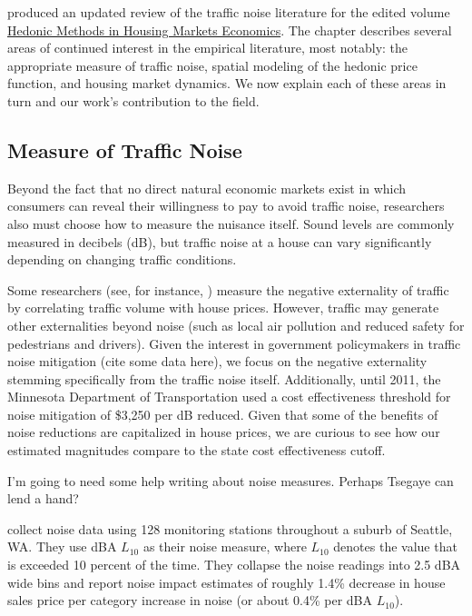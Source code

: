 \documentclass{article}\usepackage{graphicx, color}
\begin{document}
\citet{Nelson2008} produced an updated review of the traffic noise literature for the edited volume \underline{Hedonic Methods in Housing Markets Economics}. The chapter describes several areas of continued interest in the empirical literature, most notably: the appropriate measure of traffic noise, spatial modeling of the hedonic price function, and housing market dynamics. We now explain each of these areas in turn and our work's contribution to the field.

\subsection{Measure of Traffic Noise}

Beyond the fact that no direct natural economic markets exist in which consumers can reveal their willingness to pay to avoid traffic noise, researchers also must choose how to measure the nuisance itself. Sound levels are commonly measured in decibels (dB), but traffic noise at a house can vary significantly depending on changing traffic conditions.

Some researchers (see, for instance, \citet{HughesJr.1992}) measure the negative externality of traffic by correlating traffic volume with house prices. However, traffic may generate other externalities beyond noise (such as local air pollution and reduced safety for pedestrians and drivers). Given the interest in government policymakers in traffic noise mitigation (cite some data here), we focus on the negative externality stemming specifically from the traffic noise itself. Additionally, until 2011, the Minnesota Department of Transportation used a cost effectiveness threshold for noise mitigation of \$3,250 per dB reduced. Given that some of the benefits of noise reductions are capitalized in house prices, we are curious to see how our estimated magnitudes compare to the state cost effectiveness cutoff. 

I'm going to need some help writing about noise measures. Perhaps Tsegaye can lend a hand?

\citet{Huang;Palmquist2001} collect noise data using 128 monitoring stations throughout a suburb of Seattle, WA. They use dBA $L_{10}$ as their noise measure, where $L_{10}$ denotes the value that is exceeded 10 percent of the time. They collapse the noise readings into 2.5 dBA wide bins and report noise impact estimates of roughly 1.4\% decrease in house sales price per category increase in noise (or about 0.4\% per dBA $L_{10}$).
\end{document}
